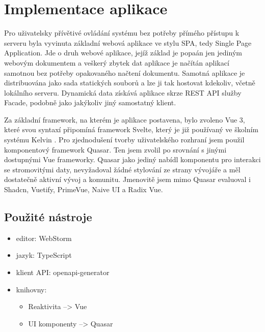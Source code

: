 \section{Implementace aplikace}
Pro uživatelsky přívětivé ovládání systému bez potřeby přímého přístupu k serveru byla vyvinuta základní webová aplikace ve stylu SPA, tedy Single Page Application. Jde o druh webové aplikace, jejíž základ je popaán jen jediným webovým dokumentem a veškerý zbytek dat aplikace je načítán aplikací samotnou bez potřeby opakovaného načtení dokumentu\cite{SPASinglepageApplication2023}. Samotná aplikace je distribuována jako sada statických souborů a lze ji tak hostovat kdekoliv, včetně lokálního serveru. Dynamická data získává aplikace skrze REST API služby Facade, podobně jako jakýkoliv jiný samostatný klient.

Za základní framework, na kterém je aplikace postavena, bylo zvoleno Vue 3, které svou syntaxí připomíná framework Svelte, který je již používaný ve školním systému Kelvin \cite{SPASinglepageApplication2023}. Pro zjednodušení tvorby uživatelského rozhraní jsem použil komponentový framework Quasar\cite{QuasarframeworkQuasar2024}. Ten jsem zvolil po srovnání s jinými dostupnými Vue frameworky. Quasar jako jediný nabídl komponentu pro interakci se stromovitými daty, nevyžadoval žádné stylování ze strany vývojáře a měl dostatečně aktivní vývoj a komunitu. Jmenovitě jsem mimo Quasar evaluoval i Shadcn\cite{RadixvueRadixvue2024}, Vuetify\cite{VuetifyjsVuetify2024}, PrimeVue\cite{PrimefacesPrimevueNext}, Naive UI\cite{TusenaiNaiveui2024} a Radix Vue\cite{RadixvueShadcnvue2024}.

\subsection{Použité nástroje}
\begin{itemize}
    \item editor: WebStorm
    \item jazyk: TypeScript
    \item klient API: openapi-generator\cite{OpenAPIToolsOpenapigeneratorOpenAPI}
    \item knihovny:
        \begin{itemize}
            \item Reaktivita --> Vue\cite{VuejsCore2024}
            \item UI komponenty --> Quasar\cite{QuasarframeworkQuasar2024}
        \end{itemize}
\end{itemize}

